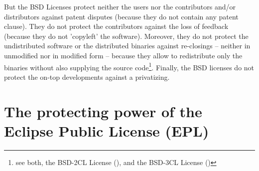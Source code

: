 But the BSD Licenses protect neither the users nor the contributors
and/or distributors against patent disputes (because they do not contain any
patent clause). They do not protect the contributors against the loss of
feedback (because they do not 'copyleft' the software). Moreover, they do not
protect the undistributed software or the distributed binaries against
re-closings -- neither in unmodified nor in modified form -- because they
allow to redistribute only the binaries without also supplying the source
code\footnote{see both, the BSD-2CL License (\cite[cf.][\nopage
wp]{BsdLicense2Clause}), and the BSD-3CL License (\cite[cf.][\nopage
wp]{BsdLicense3Clause})}. Finally, the BSD licenses do not protect the on-top
developments against a privatizing.


\section{The protecting power of the Eclipse Public License (EPL)}
\label{sec:ProtectingPowerOfEpl}

